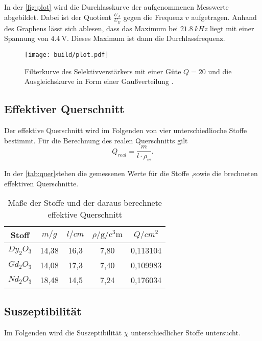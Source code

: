 In der \eqref{fig:plot} wird die Durchlasskurve der aufgenommenen Messwerte abgebildet.
Dabei ist der Quotient $\frac{U_A}{U_E}$ gegen die Frequenz $v$ aufgetragen. Anhand des Graphens lässt sich ablesen, dass das 
Maximum bei $\SI{21.8}{kHz}$ liegt mit einer Spannung von $\SI{4.4}{\volt}$. Dieses Maximum ist dann die Durchlassfrequenz.

\begin{figure}[H]
\texttt{[image: build/plot.pdf]}
	\caption{Filterkurve des Selektivverstärkers mit einer Güte $Q = 20$ und die Ausgleichskurve in Form einer Gaußverteilung .}
	\label{fig:plot}
\end{figure}

\subsection{Effektiver Querschnitt}
\label{sec:Effektiver Querschnitt}

Der effektive Querschnitt wird im Folgenden von vier unterschiedlioche Stoffe bestimmt.
Für die Berechnung des realen Querschnitts gilt 
\begin{equation}
  Q_{real}=\frac{m}{l \cdot \rho_w}.
\end{equation}

In der \eqref{tab:quer}stehen die gemessenen Werte für die Stoffe ,sowie die brechneten effektiven Querschnitte.

\begin{table}
  \centering
  \caption{Maße der Stoffe und der daraus berechnete effektive Querschnitt}
  \label{tab:quer}
\begin{tabular}{c c c c c}
  \toprule
  Stoff &  $m / \si{g}$ &  $l / \si{cm}$ &  $\rho / \unit{\gram\per\cubic\centi\meter}$ & $Q / \si{cm}^2$ \\
  \midrule
  $Dy_2O_3$ & 14,38 &  16,3 &           7,80 & 0,113104 \\
  $Gd_2O_3$ & 14,08 &  17,3 &           7,40 & 0,109983 \\
  $Nd_2O_3$ & 18,48 &  14,5 &           7,24 & 0,176034 \\
  \bottomrule
  \end{tabular}
\end{table}


\subsection{Suszeptibilität}
Im Folgenden wird die Suszeptibilität $\chi$ unterschiedlicher Stoffe untersucht.

